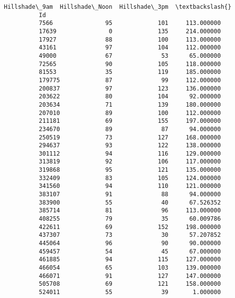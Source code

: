 \documentclass[11pt]{article}
\begin{document}
\begin{Verbatim}[commandchars=\\\{\}]
                  Hillshade\_9am  Hillshade\_Noon  Hillshade\_3pm  \textbackslash{}
          Id                                                     
          7566               95             101     113.000000   
          17639               0             135     214.000000   
          17927              88             100     113.000000   
          43161              97             104     112.000000   
          49000              67              53      65.000000   
          72565              90             105     118.000000   
          81553              35             119     185.000000   
          179775             87              99     112.000000   
          200837             97             123     136.000000   
          203622             80             104      92.000000   
          203634             71             139     180.000000   
          207010             89             100     112.000000   
          211181             69             155     197.000000   
          234670             89              87      94.000000   
          250519             73             127     168.000000   
          294637             93             122     138.000000   
          301112             94             116     129.000000   
          313819             92             106     117.000000   
          319868             95             121     135.000000   
          332409             83             105     124.000000   
          341560             94             110     121.000000   
          383107             91              88      94.000000   
          383900             55              40      67.526352   
          385714             81              96     113.000000   
          408255             79              35      60.009786   
          422611             69             152     198.000000   
          437307             73              30      57.207852   
          445064             96              90      90.000000   
          459457             54              45      67.000000   
          461885             94             115     127.000000   
          466054             65             103     139.000000   
          466071             91             127     147.000000   
          505708             69             121     158.000000   
          524011             55              39       1.000000   
          

\end{Verbatim}
\end{document}
